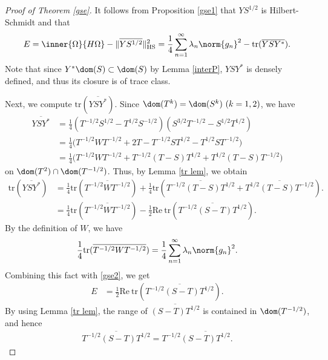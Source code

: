 \documentclass[12pt,draft]{article}
\theoremstyle{plain}
\numberwithin{equation}{section}
\theoremstyle{remark}
\begin{document}
\begin{proof}[Proof of Theorem \ref{gse}]
It follows from Proposition \ref{gse1} that $YS^{1/2}$ is Hilbert-Schmidt and that
\begin{equation}
  E = \inner{\Omega}{H\Omega} - \|\overline{YS^{1/2}}\|_{\rm HS}^2
=\frac{1}{4} \sum_{n=1}^\infty \lambda_n \norm{g_n}^2 - \mathrm{tr} (\overline{YSY^*}). \label{gse2}
\end{equation}
Note that since $Y^* \dom(S)\subset \dom(S)$ by Lemma \ref{interP}, $YSY^*$ is densely defined, and thus its closure is of trace class.

Next, we compute $\mathrm{tr}(\overline{YSY^*})$. 
Since $\dom(T^k)=\dom(S^k)\ (k=1,2)$, we have
\begin{align*}
  \overline{YSY^*}
 &= \frac{1}{4} (T^{-1/2}S^{1/2}-T^{1/2}S^{-1/2})(S^{3/2}T^{-1/2}-S^{1/2}T^{1/2}) \\
 &= \frac{1}{4} \big( T^{-1/2}WT^{-1/2} +2T-T^{-1/2}ST^{1/2}-T^{1/2}ST^{-1/2} \big)  \\
 &= \frac{1}{4} \big( T^{-1/2}WT^{-1/2} + T^{-1/2}(T-S)T^{1/2} +  T^{1/2}(T-S)T^{-1/2} \big)
\end{align*}
on $\dom(T^2)\cap \dom(T^{-1/2})$.
Thus, by Lemma \ref{tr lem}, we obtain
\begin{align*}
  \mathrm{tr}(\overline{YSY^*})
& = \frac{1}{4} \mathrm{tr}( \overline{T^{-1/2}WT^{-1/2}} )
    +\frac{1}{4} \mathrm{tr} ( \overline{T^{-1/2}(T-S)T^{1/2}} +  \overline{T^{1/2}(T-S)T^{-1/2}} ).\\
& = \frac{1}{4} \mathrm{tr}( \overline{T^{-1/2}WT^{-1/2}} ) - \frac{1}{2} \mathrm{Re} ~ \mathrm{tr} ( \overline{T^{-1/2}(S-T)T^{1/2}} ).
\end{align*}
By the definition of $W$, we have
\begin{align*}
  \frac{1}{4} \mathrm{tr}( \overline{T^{-1/2}WT^{-1/2}} )
 = \frac{1}{4} \sum_{n=1}^\infty \lambda_n\norm{g_n}^2.
\end{align*}
Combining this fact with \eqref{gse2}, we get
\begin{align*}
  E &=  \frac{1}{2} \mathrm{Re} ~ \mathrm{tr} ( \overline{T^{-1/2}(S-T)T^{1/2}} ).
\end{align*}
By using Lemma \ref{tr lem}, the range of $\overline{(S-T)T^{1/2}}$ is contained in $\dom(T^{-1/2})$, and hence
\begin{align}
 \overline{T^{-1/2}(S-T)T^{1/2}} = T^{-1/2}\overline{(S-T)T^{1/2}}.   \label{tstt}

\end{align}
\end{proof}
\end{document}
